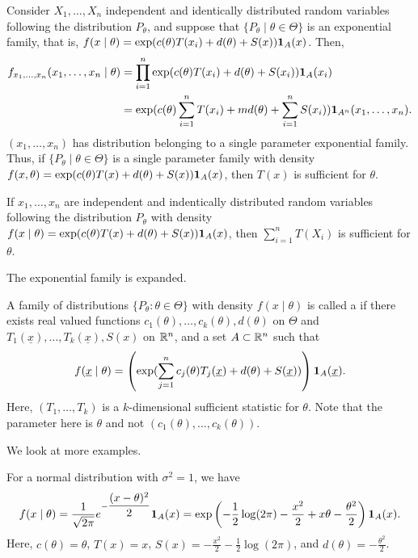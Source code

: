Consider $X_{1},\ldots,X_{n}$ independent and identically distributed random variables following the distribution $P_{\theta}$, and suppose that $\{P_{\theta} \mid \theta \in \Theta\}$ is an exponential family, that is, $f(x \mid \theta) = \exp(c(\theta) T(x_{i}) + d(\theta) + S(x))\textbf{1}_{A}(x)$. Then,
\begin{align}
    f_{x_{1},\ldots,x_{n}}(x_{1},\ldots,x_{n} \mid \theta) &= \prod_{i=1}^{n} \exp(c(\theta)T(x_{i}) + d(\theta) + S(x_{i}))\textbf{1}_{A}(x_{i}) \\
    &= \exp(c(\theta) \sum_{i=1}^{n} T(x_{i}) + md(\theta) + \sum_{i=1}^{n} S(x_{i}))\textbf{1}_{A^{n}}(x_{1},\ldots,x_{n}).
\end{align}
$(x_{1},\ldots,x_{n})$ has distribution belonging to a single parameter exponential family. Thus, if $\{P_{\theta} \mid \theta \in \Theta\}$ is a single parameter family with density $f(x,\theta) = \exp(c(\theta)T(x) + d(\theta) + S(x)) \textbf{1}_{A}(x)$, then $T(x)$ is sufficient for $\theta$.

\begin{corollary}
    If $x_{1},\ldots,x_{n}$ are independent and indentically distributed random variables following the distribution $P_{\theta}$ with density $f(x \mid \theta) = \exp(c(\theta)T(x) + d(\theta) + S(x))\textbf{1}_{A}(x)$, then $\sum_{i=1}^{n} T(X_{i})$ is sufficient for $\theta$.
\end{corollary}


The exponential family is expanded.
\begin{definition}
    A family of distributions $\{P_{\theta} : \theta \in \Theta\}$ with density $f(x \mid \theta)$ is called a  if there exists real valued functions $c_{1}(\theta),\ldots,c_{k}(\theta),d(\theta)$ on $\Theta$ and $T_{1}(\underline{x}),\ldots,T_{k}(\underline{x}),S(x)$ on $\mathbb{R}^{n}$, and a set $A \subset \mathbb{R}^{n}$ such that
    \begin{align}
        f(\underline{x} \mid \theta) = \left( \exp(\sum_{j=1}^{n} c_{j}(\theta) T_{j}(\underline{x}) + d(\theta) + S(\underline{x})) \right)  \textbf{1}_{A}(\underline{x}).
    \end{align}
    Here, $(T_{1},\ldots,T_{k})$ is a $k$-dimensional sufficient statistic for $\theta$. Note that the parameter here is $\theta$ and not $(c_{1}(\theta),\ldots,c_{k}(\theta))$.
\end{definition}

We look at more examples.

\begin{example}
    For a normal distribution with $\sigma^{2} = 1$, we have
    \begin{align}
        f(x \mid \theta) = \frac{1}{\sqrt{2\pi}} e^{-\dfrac{(x-\theta)^{2}}{2}} \textbf{1}_{A}(x) = \exp \left( -\frac{1}{2} \log (2\pi) - \frac{x^{2}}{2} + x\theta - \frac{\theta^{2}}{2} \right) \textbf{1}_{A}(x).
    \end{align}
    Here, $c(\theta) = \theta$, $T(x) = x$, $S(x) = -\frac{x^{2}}{2}-\frac{1}{2}\log(2\pi)$, and $d(\theta) = -\frac{\theta^{2}}{2}$.
\end{example}

